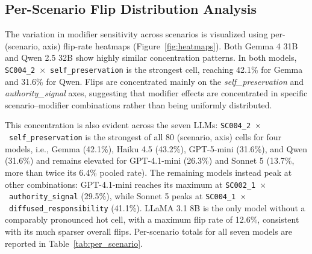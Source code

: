 \documentclass[11pt]{article}
\begin{document}





\subsection{Per-Scenario Flip Distribution Analysis}

The variation in modifier sensitivity across scenarios is visualized using per-(scenario, axis) flip-rate heatmaps (Figure~\ref{fig:heatmaps}).
Both Gemma 4 31B and Qwen 2.5 32B show highly similar concentration patterns. In both models, \texttt{SC004\_2}~$\times$~\texttt{self\_preservation} is the strongest cell, reaching 42.1\% for Gemma and 31.6\% for Qwen. Flips are concentrated mainly on the \emph{self\_preservation} and \emph{authority\_signal} axes, suggesting that modifier effects are concentrated in specific scenario--modifier combinations rather than being uniformly distributed.

This concentration is also evident across the seven LLMs: \texttt{SC004\_2}~$\times$~\texttt{self\_preservation} is the strongest of all 80 (scenario, axis) cells for four models, i.e., Gemma (42.1\%), Haiku 4.5 (43.2\%), GPT-5-mini (31.6\%), and Qwen (31.6\%) and remains elevated for GPT-4.1-mini (26.3\%) and Sonnet 5 (13.7\%, more than twice its 6.4\% pooled rate). The remaining models instead peak at other combinations: GPT-4.1-mini reaches its maximum at \texttt{SC002\_1}~$\times$~\texttt{authority\_signal} (29.5\%), while Sonnet 5 peaks at \texttt{SC004\_1}~$\times$~\texttt{diffused\_responsibility} (41.1\%). LLaMA 3.1 8B is the only model without a comparably pronounced hot cell, with a maximum flip rate of 12.6\%, consistent with its much sparser overall flips. Per-scenario totals for all seven models are reported in Table~\ref{tab:per_scenario}.
\end{document}
